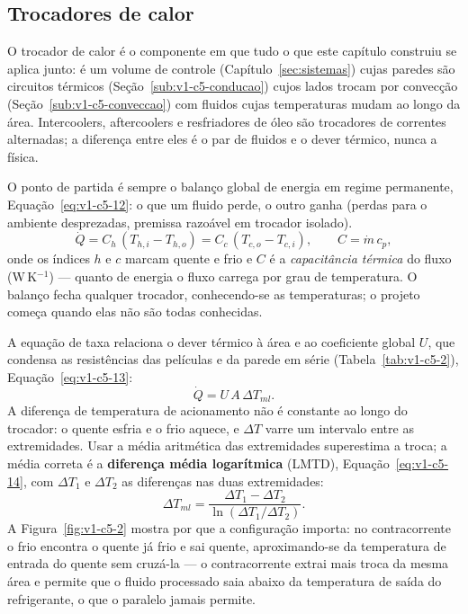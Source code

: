 \documentclass[12pt,a4paper]{article}
\numberwithin{equation}{section}
\numberwithin{table}{section}
\numberwithin{figure}{section}
\begin{document}
\subsection{Trocadores de calor}\label{sub:v1-c5-trocadores}

O trocador de calor é o componente em que tudo o que este capítulo construiu
se aplica junto: é um volume de controle (Capítulo~\ref{sec:sistemas}) cujas
paredes são circuitos térmicos (Seção~\ref{sub:v1-c5-conducao}) cujos lados
trocam por convecção (Seção~\ref{sub:v1-c5-conveccao}) com fluidos cujas
temperaturas mudam ao longo da área. Intercoolers, aftercoolers e
resfriadores de óleo são trocadores de correntes alternadas; a
diferença entre eles é o par de fluidos e o dever térmico, nunca a
física.

O ponto de partida é sempre o balanço global de energia em regime
permanente, Equação~\eqref{eq:v1-c5-12}: o que um fluido perde, o outro
ganha (perdas para o ambiente desprezadas, premissa razoável em trocador
isolado).
\begin{equation}\label{eq:v1-c5-12}
\dot{Q} = C_h\,(T_{h,i} - T_{h,o}) = C_c\,(T_{c,o} - T_{c,i}),
\qquad C = \dot{m}\,c_p ,
\end{equation}
onde os índices $h$ e $c$ marcam quente e frio e $C$ é a \emph{capacitância
térmica} do fluxo (W\,K$^{-1}$) --- quanto de energia o fluxo carrega por
grau de temperatura. O balanço fecha qualquer trocador, conhecendo-se as
temperaturas; o projeto começa quando elas não são todas conhecidas.

A equação de taxa relaciona o dever térmico à área e ao coeficiente global
$U$, que condensa as resistências das películas e da parede em série
(Tabela~\ref{tab:v1-c5-2}), Equação~\eqref{eq:v1-c5-13}:
\begin{equation}\label{eq:v1-c5-13}
\dot{Q} = U \, A \, \Delta T_{ml}.
\end{equation}
A diferença de temperatura de acionamento não é constante ao longo do
trocador: o quente esfria e o frio aquece, e $\Delta T$ varre um intervalo
entre as extremidades. Usar a média aritmética das extremidades superestima
a troca; a média correta é a \textbf{diferença média logarítmica} (LMTD),
Equação~\eqref{eq:v1-c5-14}, com $\Delta T_1$ e $\Delta T_2$ as diferenças
nas duas extremidades:
\begin{equation}\label{eq:v1-c5-14}
\Delta T_{ml} = \frac{\Delta T_1 - \Delta T_2}{\ln(\Delta T_1 / \Delta T_2)}.
\end{equation}
A Figura~\ref{fig:v1-c5-2} mostra por que a configuração importa: no
contracorrente o frio encontra o quente já frio e sai quente, aproximando-se
da temperatura de entrada do quente sem cruzá-la --- o contracorrente extrai
mais troca da mesma área e permite que o fluido processado saia abaixo da
temperatura de saída do refrigerante, o que o paralelo jamais permite.
\end{document}
